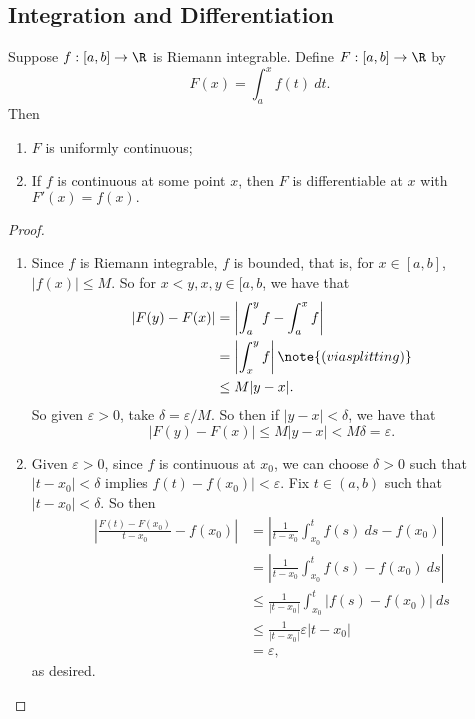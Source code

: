 \documentclass{notes}
\begin{document}
\subsection{Integration and Differentiation}
\begin{theorem}
  Suppose $f: [a,b] \to \R$ is Riemann integrable. Define $F: [a,b] \to \R$ by $$F(x) = \int_a^x
  f(t)\ dt.$$ Then 
  \begin{enumerate}
    \item $F$ is uniformly continuous;
    \item If $f$ is continuous at some point $x$, then $F$ is differentiable at $x$ with $F'(x) =
      f(x).$
  \end{enumerate}
\end{theorem}
\begin{proof}\leavevmode
  \begin{enumerate}
  \item Since $f$ is Riemann integrable, $f$ is bounded, that is, for $x\in[a,b]$, $|f(x)| \leq M$. So for
  $x < y, x,y\in [a,b$, we have that 
    \begin{align*}
      |F(y) - F(x)| &= \left|\int_a^y f - \int_a^x f \right| \\
                  &= \left| \int_x^y f \right|  \note{(via splitting)} \\
                  &\leq M |y - x|.
    \end{align*}
  So given $\varepsilon > 0$, take $\delta = \varepsilon / M$. So then if $|y-x| < \delta$, we have
  that $$|F(y) - F(x)| \leq M|y-x| < M\delta = \varepsilon.$$

   \item Given $\varepsilon > 0$, since $f$ is continuous at $x_0$, we can choose $\delta > 0$ such
     that $|t - x_0| < \delta$ implies $f(t) - f(x_0)| < \varepsilon.$ Fix $t\in(a,b)$ such that $|t -
     x_0| < \delta$. So then
     \begin{align*}
       \left| \frac{F(t) - F(x_0)}{t - x_0} - f(x_0) \right| &= \left| \frac{1}{t - x_0}
       \int_{x_0}^t f(s)\ ds - f(x_0) \right| \\
       &= \left| \frac{1}{t - x_0} \int_{x_0}^t f(s) - f(x_0)\ ds \right| \\
       &\leq \frac{1}{|t - x_0|} \int_{x_0}^t |f(s) - f(x_0)|\ ds \\
       &\leq \frac{1}{|t - x_0|} \varepsilon |t - x_0| \\
       &= \varepsilon,
     \end{align*}
    as desired.
  \end{enumerate}
\end{proof}
\end{document}
